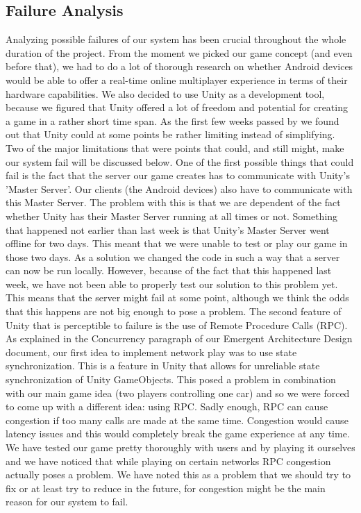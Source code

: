 \documentclass[11pt,twoside,a4paper]{article}
\begin{document}
\subsection*{Failure Analysis}
Analyzing possible failures of our system has been crucial throughout the whole duration of the project. From the moment we picked our game concept (and even before that), we had to do a lot of thorough research on whether Android devices would be able to offer a real-time online multiplayer experience in terms of their hardware capabilities.\newline
We also decided to use Unity as a development tool, because we figured that Unity offered a lot of freedom and potential for creating a game in a rather short time span. As the first few weeks passed by we found out that Unity could at some points be rather limiting instead of simplifying. Two of the major limitations that were points that could, and still might, make our system fail will be discussed below.
\newline
\newline
One of the first possible things that could fail is the fact that the server our game creates has to communicate with Unity's 'Master Server'. Our clients (the Android devices) also have to communicate with this Master Server. The problem with this is that we are dependent of the fact whether Unity has their Master Server running at all times or not. Something that happened not earlier than last week is that Unity's Master Server went offline for two days. This meant that we were unable to test or play our game in those two days. As a solution we changed the code in such a way that a server can now be run locally. However, because of the fact that this happened last week, we have not been able to properly test our solution to this problem yet. This means that the server might fail at some point, although we think the odds that this happens are not big enough to pose a problem.
\newline
\newline
The second feature of Unity that is perceptible to failure is the use of Remote Procedure Calls (RPC). As explained in the Concurrency paragraph of our Emergent Architecture Design document, our first idea to implement network play was to use state synchronization. This is a feature in Unity that allows for unreliable state synchronization of Unity GameObjects. This posed a problem in combination with our main game idea (two players controlling one car) and so we were forced to come up with a different idea: using RPC. Sadly enough, RPC can cause congestion if too many calls are made at the same time. Congestion would cause latency issues and this would completely break the game experience at any time. We have tested our game pretty thoroughly with users and by playing it ourselves and we have noticed that while playing on certain networks RPC congestion actually poses a problem. We have noted this as a problem that we should try to fix or at least try to reduce in the future, for congestion might be the main reason for our system to fail.
\end{document}
